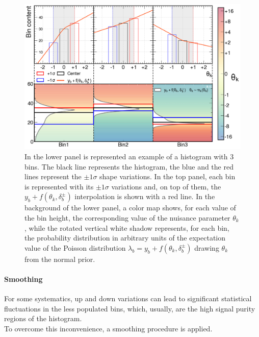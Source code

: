 \begin{figure}[h!]
    \centering
    \includegraphics[width=\linewidth]{fig//chap05-stats/morphing.png}
    \caption{In the lower panel is represented an example of a histogram with 3 bins. The black line represents the histogram, the blue and the red lines represent the $\pm 1 \sigma$ shape variations.
    In the top panel, each bin is represented with its $\pm 1 \sigma$ variations and, on top of them, the $y_b+f(\theta_k,\delta_b^\pm)$ interpolation is shown with a red line. In the background of the lower panel, a color map shows, for each value of the bin height, the corresponding value of the nuisance parameter $\theta_k$, while the rotated vertical white shadow represents, for each bin, the probability distribution in arbitrary units of the expectation value of the Poisson distribution $\lambda_b=y_b+f(\theta_k,\delta_b^\pm)$ drawing $\theta_k$ from the normal prior.}
    \label{fig:morphing}
\end{figure}
\newpage
\vspace{0.5cm}
\paragraph*{Smoothing}
For some systematics, up and down variations can lead to significant statistical fluctuations in the less populated bins, which, usually, are the high signal purity regions of the histogram.\\
To overcome this inconvenience, a smoothing procedure is applied.

